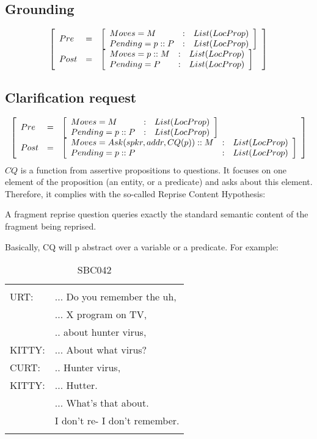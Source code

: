 \documentclass[11pt]{article}
\newenvironment{sbcquote}[2]
{
	\def\savedcaption{\caption{#1}}%
	\def\savedlabel{\label{#2}}%
	\begin{table}[h]
		\centering
		\begin{small}
		\begin{tabular}{ll}
			\hline
			& \\
}
{
	& \\
	\hline
	\end{tabular}
	\end{small}
	\savedcaption
	\savedlabel
\end{table}
}
\newenvironment{recenv}
{\left[\begin{array}{lll}}
{\end{array}\right]}
\begin{document}
		\subsection{Grounding}
			\begin{equation*}
			\begin{recenv}
			Pre  &=& \begin{recenv}
			Moves = M &:& List(LocProp) \\
			Pending = p :: P &:& List(LocProp)\\
			\end{recenv}\\
			Post &=& \begin{recenv}
			Moves = p :: M &:& List(LocProp)\\
			Pending = P &:& List(LocProp)
			\end{recenv}
			\end{recenv}
			\end{equation*}
		\subsection{Clarification request}
			\begin{equation*}
			\begin{recenv}
			Pre  &=& \begin{recenv}
			Moves = M &:& List(LocProp) \\
			Pending = p :: P &:& List(LocProp)\\
			\end{recenv}\\
			Post &=& \begin{recenv}
			Moves = Ask(spkr, addr, CQ(p)) :: M &:& List(LocProp)\\
			Pending = p :: P &:& List(LocProp)
			\end{recenv}
			\end{recenv}
			\end{equation*}
			$CQ$ is a function from assertive propositions to questions. It focuses on one element of the proposition (an entity, or a predicate) and asks about this element. Therefore, it complies with the so-called Reprise Content Hypothesis:
			\begin{center}
				A fragment reprise question queries exactly the standard semantic content of the fragment being reprised.
			\end{center}
			Basically, CQ will p abstract over a variable or a predicate. For example:
			
			\begin{sbcquote}{SBC042}
				CURT:&	... Do you remember the uh,\\
				&... X program on TV,\\
				&.. about hunter virus,\\
				KITTY:&	... About what virus?\\
				CURT:&	.. Hunter virus,\\
				KITTY:&	... Hutter.\\
				&... What's that about.\\
				&I don't re- I don't remember.\\
			\end{sbcquote}
\end{document}
